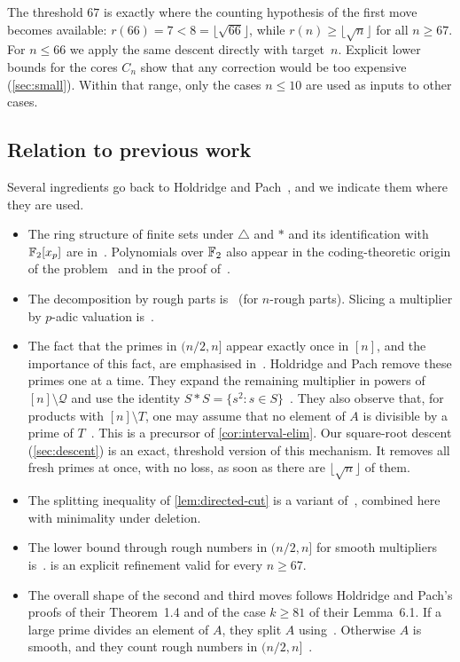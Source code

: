 The threshold $67$ is exactly where the counting hypothesis of the first move becomes available: $r(66)=7<8=\lfloor\sqrt{66}\rfloor$, while $r(n)\ge\lfloor\sqrt n\rfloor$ for all $n\ge67$. For $n\le66$ we apply the same descent directly with target~$n$. Explicit lower bounds for the cores $C_n$ show that any correction would be too expensive (\cref{sec:small}). Within that range, only the cases $n\le10$ are used as inputs to other cases.

\subsection{Relation to previous work}\label{sec:prior}
Several ingredients go back to Holdridge and Pach~\cite{HP}, and we indicate them where they are used.
\begin{itemize}
\item The ring structure of finite sets under $\triangle$ and $*$ and its identification with $\mathbb{F}_2[x_p]$ are in~\cite[Lemmas~2.1--2.2]{HP}. Polynomials over $\mathbb{F}_2$ also appear in the coding-theoretic origin of the problem~\cite{Pilz,PS} and in the proof of~\cite{NP}.
\item The decomposition by rough parts is~\cite[Lemma~2.4]{HP} (for $n$-rough parts). Slicing a multiplier by $p$-adic valuation is~\cite[Section~3]{HP}.
\item The fact that the primes in $(n/2,n]$ appear exactly once in $[n]$, and the importance of this fact, are emphasised in~\cite[Section~1]{HP}. Holdridge and Pach remove these primes one at a time. They expand the remaining multiplier in powers of $[n]\setminus\mathcal Q$ and use the identity $S*S=\{s^2:s\in S\}$~\cite[Lemma~6.2 and Section~6]{HP}. They also observe that, for products with $[n]\setminus T$, one may assume that no element of $A$ is divisible by a prime of $T$~\cite[proof of Lemma~6.1]{HP}. This is a precursor of \cref{cor:interval-elim}. Our square-root descent (\cref{sec:descent}) is an exact, threshold version of this mechanism. It removes all fresh primes at once, with no loss, as soon as there are $\lfloor\sqrt n\rfloor$ of them.
\item The splitting inequality of \cref{lem:directed-cut} is a variant of~\cite[Lemma~4.1 and Corollary~4.3]{HP}, combined here with minimality under deletion.
\item The lower bound through rough numbers in $(n/2,n]$ for smooth multipliers is~\cite[Lemma~4.4]{HP}.  is an explicit refinement valid for every $n\ge67$.
\item The overall shape of the second and third moves follows Holdridge and Pach's proofs of their Theorem~1.4 and of the case $k\ge81$ of their Lemma~6.1. If a large prime divides an element of $A$, they split $A$ using~\cite[Corollary~4.3]{HP}. Otherwise $A$ is smooth, and they count rough numbers in $(n/2,n]$~\cite[Lemma~4.4]{HP}.

\end{itemize}

